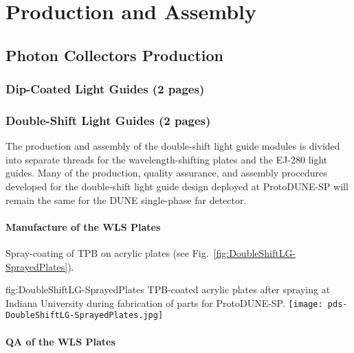 \section{Production and Assembly}
\label{sec:fdsp-pd-prod-assy}

\subsection{Photon Collectors Production}
\label{sec:fdsp-pd-prod-pc}
	
\subsubsection{Dip-Coated Light Guides (2 pages)}
\label{ssec:fdsp-pd-pc-prod-bar1}

\subsubsection{Double-Shift Light Guides (2 pages)}
\label{ssec:fdsp-pd-pc-prod-bar2}

The production and assembly of the double-shift light guide modules is divided 
into separate threads for the wavelength-shifting plates and the EJ-280 light guides. 
Many of the production, quality assurance, and assembly procedures developed for the
 double-shift light guide design deployed at ProtoDUNE-SP will remain the same for 
the DUNE single-phase far detector.

\paragraph*{Manufacture of the WLS Plates}

Spray-coating of TPB on acrylic plates (see Fig.~\ref{fig:DoubleShiftLG-SprayedPlates}).

\begin{dunefigure}{fig:DoubleShiftLG-SprayedPlates}
 {TPB-coated acrylic plates after spraying at Indiana University during fabrication of parts for ProtoDUNE-SP.}
  \texttt{[image: pds-DoubleShiftLG-SprayedPlates.jpg]}
\end{dunefigure}

\paragraph*{QA of the WLS Plates}

